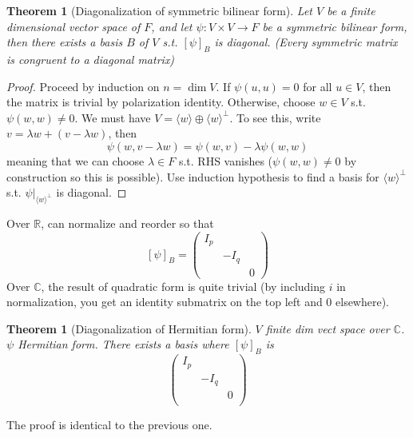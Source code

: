 \documentclass{article}
\theoremstyle{definition}
\theoremstyle{remark}
\theoremstyle{plain}
\newtheorem{thm}[defn]{Theorem}
\newcommand{\RR}{\mathbb{R}}
\newcommand{\CC}{\mathbb{C}}
\begin{document}
\begin{thm}[Diagonalization of symmetric bilinear form]
    Let $V$ be a finite dimensional vector space of $F$, and let $\psi:V\times V\to F$ be a symmetric bilinear form, then there exists a basis $B$ of $V$ s.t. $[\psi]_B$ is diagonal. (Every symmetric matrix is congruent to a diagonal matrix)
\end{thm}
\begin{proof}
    Proceed by induction on $n=\dim V$. If $\psi(u,u)=0$ for all $u\in V$, then the matrix is trivial by polarization identity. Otherwise, choose $w\in V$ s.t. $\psi(w,w)\neq 0$. We must have $V=\langle w\rangle\oplus\langle w\rangle^\perp$. To see this, write $v=\lambda w+(v-\lambda w)$, then 
    \[\psi(w,v-\lambda w)=\psi(w,v)-\lambda\psi(w,w)\]
    meaning that we can choose $\lambda\in F$ s.t. RHS vanishes ($\psi(w,w)\neq 0$ by construction so this is possible).
    Use induction hypothesis to find a basis for $\langle w\rangle^\perp$ s.t. $\psi|_{\langle w\rangle^\perp}$ is diagonal.
\end{proof}
Over $\RR$, can normalize and reorder so that $$[\psi]_B=\begin{pmatrix}
    I_p & & \\
    & -I_q & \\
    & & 0
\end{pmatrix}$$
Over $\CC$, the result of quadratic form is quite trivial (by including $i$ in normalization, you get an identity submatrix on the top left and 0 elsewhere).
\begin{thm}[Diagonalization of Hermitian form]
    $V$ finite dim vect space over $\CC$. $\psi$ Hermitian form. There exists a basis where $[\psi]_B$ is 
    \[
    \begin{pmatrix}
        I_p &&\\
        &-I_q&\\
        && 0\\
    \end{pmatrix}
    \]
\end{thm}
The proof is identical to the previous one.
\end{document}
